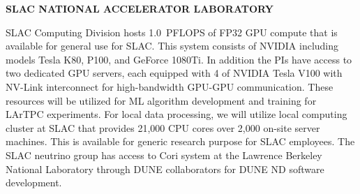 \begin{center}
  {\sc \bf SLAC NATIONAL ACCELERATOR LABORATORY}\\
\end{center}

SLAC Computing Division hosts 1.0~PFLOPS of FP32 GPU compute that is available for general use for SLAC. This system consists of NVIDIA including models Tesla K80, P100, and GeForce 1080Ti. In addition the PIs have access to two dedicated GPU servers, each equipped with 4 of NVIDIA Tesla V100 with NV-Link interconnect for high-bandwidth GPU-GPU communication. These resources will be utilized for ML algorithm development and training for LArTPC experiments. For local data processing, we will utilize local computing cluster at SLAC that provides 21,000 CPU cores over 2,000 on-site server machines. This is available for generic research purpose for SLAC employees. The SLAC neutrino group has access to Cori system at the Lawrence Berkeley National Laboratory through DUNE collaborators for DUNE ND software development.